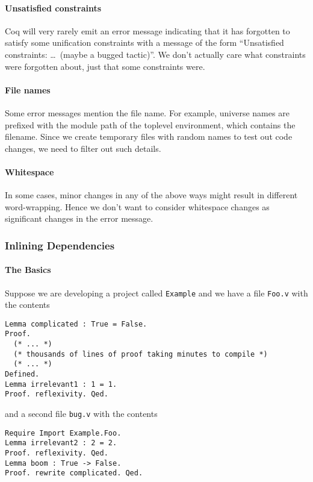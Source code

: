 \documentclass[a4paper,USenglish,cleveref,autoref,thm-restate]{lipics-v2021}
\begin{document}
\paragraph{Unsatisfied constraints}
Coq will very rarely emit an error message indicating that it has forgotten to satisfy some unification constraints with a message of the form ``Unsatisfied constraints: \ldots\ (maybe a bugged tactic)''.
We don't actually care what constraints were forgotten about, just that some constraints were.

\paragraph{File names}
Some error messages mention the file name.
For example, universe names are prefixed with the module path of the toplevel environment, which contains the filename.
Since we create temporary files with random names to test out code changes, we need to filter out such details.

\paragraph{Whitespace}
In some cases, minor changes in any of the above ways might result in different word-wrapping.
Hence we don't want to consider whitespace changes as significant changes in the error message.

\subsubsection{Inlining Dependencies}\label{sec:inline-deps}

\paragraph{The Basics}

Suppose we are developing a project called \verb|Example| and we have a file \verb|Foo.v| with the contents
\begin{verbatim}
Lemma complicated : True = False.
Proof.
  (* ... *)
  (* thousands of lines of proof taking minutes to compile *)
  (* ... *)
Defined.
Lemma irrelevant1 : 1 = 1.
Proof. reflexivity. Qed.
\end{verbatim}
and a second file \verb|bug.v| with the contents
\begin{verbatim}
Require Import Example.Foo.
Lemma irrelevant2 : 2 = 2.
Proof. reflexivity. Qed.
Lemma boom : True -> False.
Proof. rewrite complicated. Qed.
\end{verbatim}
\end{document}
